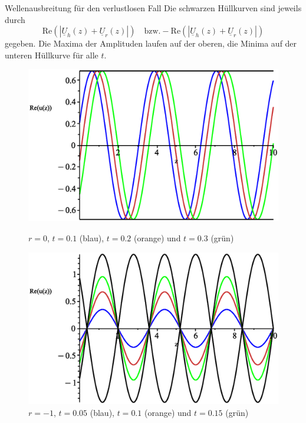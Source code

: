 \documentclass{beamer}
\begin{document}
\begin{frame}{Wellenausbreitung für den verlustlosen Fall}
Die schwarzen Hüllkurven sind jeweils durch
\[
\mathrm{Re} ( \left| \underline{U}_{h}(z) + \underline{U}_{r}(z) \right| )
\quad \text{bzw.}
- \mathrm{Re} ( \left| \underline{U}_{h}(z) + \underline{U}_{r}(z) \right| )
\] gegeben. Die Maxima der Amplituden laufen auf der oberen, die Minima auf der unteren Hüllkurve
für alle $t$.
\begin{figure}[H]
    \begin{minipage}{0.32\textwidth}
        \centering
        \includegraphics[width=\linewidth]{../graphics/Enveloppe/verlustlos/R0}
        \caption*{$r=0$, $t=0.1$ (blau), $t=0.2$ (orange) und $t=0.3$ (grün)}
    \end{minipage}
    \hfill
    \begin{minipage}{0.32\textwidth}
        \centering
        \includegraphics[width=\linewidth]{../graphics/Enveloppe/verlustlos/R-1}
        \caption*{$r=-1$, $t=0.05$ (blau), $t=0.1$ (orange) und $t=0.15$ (grün)}

\end{minipage}
\end{figure}
\end{frame}
\end{document}
